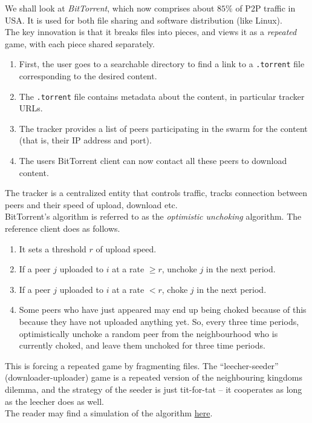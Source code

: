 		We shall look at \emph{BitTorrent}, which now comprises about $85\%$ of P2P traffic in USA. It is used for both file sharing and software distribution (like Linux).\\
		The key innovation is that it breaks files into pieces, and views it as a \emph{repeated} game, with each piece shared separately.
		\begin{enumerate}
			\item First, the user goes to a searchable directory to find a link to a \texttt{.torrent} file corresponding to the desired content.
			\item The \texttt{.torrent} file contains metadata about the content, in particular tracker URLs.
			\item The tracker provides a list of peers participating in the swarm for the content (that is, their IP address and port).
			\item The users BitTorrent client can now contact all these peers to download content.
		\end{enumerate}
		The tracker is a centralized entity that controls traffic, tracks connection between peers and their speed of upload, download etc.\\
		BitTorrent's algorithm is referred to as the \emph{optimistic unchoking} algorithm. The reference client does as follows.
		\begin{enumerate}
			\item It sets a threshold $r$ of upload speed. %
			\item If a peer $j$ uploaded to $i$ at a rate $\ge r$, unchoke $j$ in the next period.
			\item If a peer $j$ uploaded to $i$ at a rate $< r$, choke $j$ in the next period.
			\item Some peers who have just appeared may end up being choked because of this because they have not uploaded anything yet. So, every three time periods, optimistically unchoke a random peer from the neighbourhood who is currently choked, and leave them unchoked for three time periods.
		\end{enumerate}
		This is forcing a repeated game by fragmenting files. The ``leecher-seeder'' (downloader-uploader) game is a repeated version of the neighbouring kingdoms dilemma, and the strategy of the seeder is just tit-for-tat -- it cooperates as long as the leecher does as well.\\
		The reader may find a simulation of the algorithm \href{http://mg8.org/processing/bt.html}{here}.\\

